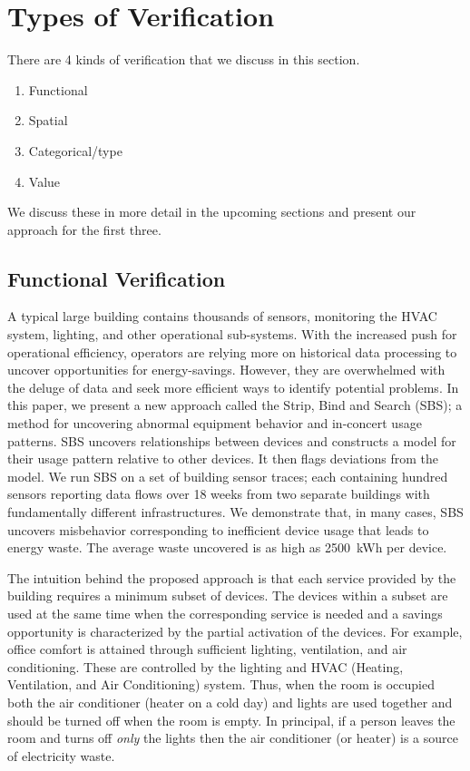 \section{Types of Verification}
There are 4 kinds of verification that we discuss in this section.

\begin{enumerate}
\item Functional
\item Spatial
\item Categorical/type
\item Value
\end{enumerate}

We discuss these in more detail in the upcoming sections and present our approach for the first three.

\subsection{Functional Verification}%
A typical large building contains thousands of sensors, monitoring the HVAC system, lighting, and other operational sub-systems.
With the increased push for operational efficiency, operators are relying more on historical data processing to uncover opportunities for energy-savings.
However, they are overwhelmed with the deluge of data and seek more efficient ways to identify potential problems.
In this paper, we present a new approach called the Strip, Bind and Search (SBS); a method for uncovering abnormal 
equipment behavior and in-concert usage patterns.
SBS uncovers relationships between devices and constructs a model for their usage pattern relative to other devices.
It then flags deviations from the model. 
We run SBS on a set of building sensor traces; each containing hundred sensors reporting data flows over 18 weeks from two separate buildings with fundamentally different infrastructures.  
We demonstrate that, in many cases, SBS uncovers misbehavior corresponding to inefficient device usage that leads to energy waste.  
The average waste uncovered is as high as 2500~kWh per device. 

The intuition behind the proposed approach is that each service provided by the building requires a minimum subset of devices.
The devices within a subset are used at the same time when the corresponding service is needed and a savings opportunity is characterized by the partial activation of the devices.
For example, office comfort is attained through sufficient lighting, ventilation, and air conditioning.
These are controlled by the lighting and HVAC (Heating, Ventilation, and Air Conditioning) system.
Thus, when the room is occupied both the air conditioner (heater on a cold day) and lights are used together and should be turned off 
when the room is empty.
In principal, if a person leaves the room and turns off \emph{only} the lights then the air conditioner (or heater) is a source of electricity waste.

